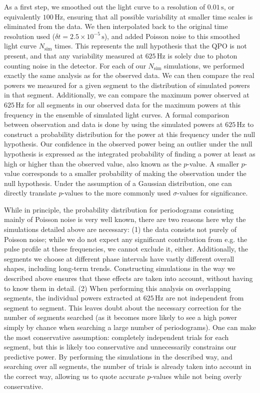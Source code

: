 \documentclass{emulateapj}
\begin{document}
As a first step, we smoothed out the light curve to a resolution of $0.01 \, \mathrm{s}$, or equivalently $100 \, \mathrm{Hz}$, ensuring that all possible variability at smaller time scales is eliminated from the data. We then interpolated back to the original time resolution used ($\delta t = 2.5 \times 10^{-5} \, \mathrm{s}$), and added Poisson noise to this smoothed light curve $N_{\mathrm{sim}}$ times. This represents the null hypothesis that the QPO is not present, and that any variability measured at $625 \, \mathrm{Hz}$ is solely due to photon counting noise in the detector. For each of our $N_{\mathrm{sim}}$ simulations, we performed exactly the same analysis as for the observed data. We can then compare the real powers we measured for a given segment to the distribution of simulated powers in that segment. Additionally, we can compare the maximum power observed at $625 \, \mathrm{Hz}$ for all segments in our observed data for the maximum powers at this frequency in the ensemble of simulated light curves. A formal comparison between observation and data is done by using the simulated powers at $625 \, \mathrm{Hz}$ to construct a probability distribution for the power at this frequency under the null hypothesis. Our confidence in the observed power being an outlier under the null hypothesis is expressed as the integrated probability of finding a power at least as high or higher than the observed value, also known as the $p$-value. A smaller $p$-value corresponds to a smaller probability of making the observation under the null hypothesis. Under the assumption of a Gaussian distribution, one can directly translate $p$-values to the more commonly used $\sigma$-values for significance. 

While in principle, the probability distribution for periodograms consisting mainly of Poisson noise is very well known, there are two reasons here why the simulations detailed above are necessary: (1) the data consists not purely of Poisson noise; while we do not expect any significant contribution from e.g. the pulse profile at these frequencies, we cannot exclude it, either. Additionally, the segments we choose at different phase intervals have vastly different overall shapes, including long-term trends. Constructing simulations in the way we described above ensures that these effects are taken into account, without having to know them in detail. (2) When performing this analysis on overlapping segments, the individual powers extracted at $625 \, \mathrm{Hz}$ are not independent from segment to segment. This leaves doubt about the necessary correction for the number of segments searched (as it becomes more likely to see a high power simply by chance when searching a large number of periodograms). One can make the most conservative assumption: completely independent trials for each segment, but this is likely too conservative and unnecessarily constrains our predictive power. By performing the simulations in the described way, and searching over all segments, the number of trials is already taken into account in the correct way, allowing us to quote accurate $p$-values while not being overly conservative.
\end{document}
